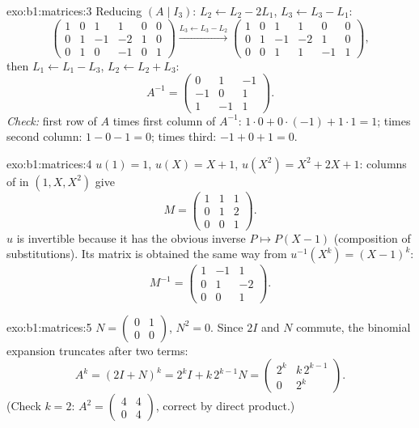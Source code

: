\begin{solution}{exo:b1:matrices:3}
Reducing $(A \mid I_3)$: $L_2 \leftarrow L_2 - 2L_1$, $L_3
\leftarrow L_3 - L_1$:
\[
\begin{pmatrix}
1 & 0 & 1 & 1 & 0 & 0\\
0 & 1 & -1 & -2 & 1 & 0\\
0 & 1 & 0 & -1 & 0 & 1
\end{pmatrix}
\xrightarrow{L_3 \leftarrow L_3 - L_2}
\begin{pmatrix}
1 & 0 & 1 & 1 & 0 & 0\\
0 & 1 & -1 & -2 & 1 & 0\\
0 & 0 & 1 & 1 & -1 & 1
\end{pmatrix},
\]
then $L_1 \leftarrow L_1 - L_3$, $L_2 \leftarrow L_2 + L_3$:
\[
A^{-1} = \begin{pmatrix}
0 & 1 & -1\\
-1 & 0 & 1\\
1 & -1 & 1
\end{pmatrix}.
\]
\emph{Check:} first row of $A$ times first column of $A^{-1}$: $1
\cdot 0 + 0\cdot(-1) + 1\cdot 1 = 1$; times second column: $1 - 0 -
1 = 0$; times third: $-1 + 0 + 1 = 0$.
\end{solution}

\begin{solution}{exo:b1:matrices:4}
$u(1) = 1$, $u(X) = X + 1$, $u(X^2) = X^2 + 2X + 1$: columns of
 in $(1, X, X^2)$ give
\[
M = \begin{pmatrix}
1 & 1 & 1\\
0 & 1 & 2\\
0 & 0 & 1
\end{pmatrix}.
\]
$u$ is invertible because it has the obvious inverse $P \mapsto P(X
- 1)$ (composition of substitutions). Its matrix is obtained the
same way from $u^{-1}(X^k) = (X-1)^k$:
\[
M^{-1} = \begin{pmatrix}
1 & -1 & 1\\
0 & 1 & -2\\
0 & 0 & 1
\end{pmatrix}.
\]
\end{solution}

\begin{solution}{exo:b1:matrices:5}
$N = \begin{pmatrix} 0 & 1\\ 0 & 0\end{pmatrix}$, $N^2 = 0$. Since
$2I$ and $N$ commute, the binomial expansion truncates after two
terms:
\[
A^k = (2I + N)^k = 2^k I + k\,2^{k-1} N
= \begin{pmatrix} 2^k & k\,2^{k-1}\\ 0 & 2^k\end{pmatrix}.
\]
(Check $k = 2$: $A^2 = \begin{pmatrix}4 & 4\\ 0 & 4\end{pmatrix}$,
correct by direct product.)
\end{solution}

